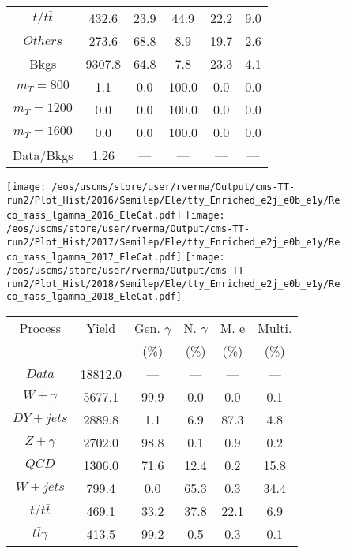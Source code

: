 \begin{figure}
\begin{minipage}[c]{0.32\textwidth}
{\begin{tabular}{cccccc}
$ t/t\bar{t} $ &  432.6 &  23.9 &  44.9 &  22.2 &  9.0\\
$ Others $ &  273.6 &  68.8 &  8.9 &  19.7 &  2.6\\
Bkgs &  9307.8 &  64.8 &  7.8 &  23.3 &  4.1\\
$ m_{T} = 800 $ &  1.1 &  0.0 &  100.0 &  0.0 &  0.0\\
$ m_{T} = 1200 $ &  0.0 &  0.0 &  100.0 &  0.0 &  0.0\\
$ m_{T} = 1600 $ &  0.0 &  0.0 &  100.0 &  0.0 &  0.0\\
Data/Bkgs &  1.26 &  --- &  --- &  --- &  ---\\
\hline
\end{tabular}
}
\end{minipage}
\end{figure}

\begin{figure}
\centering
\texttt{[image: /eos/uscms/store/user/rverma/Output/cms-TT-run2/Plot\_Hist/2016/Semilep/Ele/tty\_Enriched\_e2j\_e0b\_e1y/Reco\_mass\_lgamma\_2016\_EleCat.pdf]}
\texttt{[image: /eos/uscms/store/user/rverma/Output/cms-TT-run2/Plot\_Hist/2017/Semilep/Ele/tty\_Enriched\_e2j\_e0b\_e1y/Reco\_mass\_lgamma\_2017\_EleCat.pdf]}
\texttt{[image: /eos/uscms/store/user/rverma/Output/cms-TT-run2/Plot\_Hist/2018/Semilep/Ele/tty\_Enriched\_e2j\_e0b\_e1y/Reco\_mass\_lgamma\_2018\_EleCat.pdf]}
\begin{minipage}[c]{0.32\textwidth}
\centering
\tiny{
\begin{tabular}{cccccc}
\hline
Process & Yield & Gen. $\gamma$ & N. $\gamma$ & M. e & Multi. \\
 &  & (\%) & (\%) & (\%) & (\%)  \\
\hline
                                                                      $ Data $ &  18812.0 &  --- &  --- &  --- &  ---\\
$ W+\gamma $ &  5677.1 &  99.9 &  0.0 &  0.0 &  0.1\\
$ DY+jets $ &  2889.8 &  1.1 &  6.9 &  87.3 &  4.8\\
$ Z+\gamma $ &  2702.0 &  98.8 &  0.1 &  0.9 &  0.2\\
$ QCD $ &  1306.0 &  71.6 &  12.4 &  0.2 &  15.8\\
$ W+jets $ &  799.4 &  0.0 &  65.3 &  0.3 &  34.4\\
$ t/t\bar{t} $ &  469.1 &  33.2 &  37.8 &  22.1 &  6.9\\
$ t\bar{t}\gamma $ &  413.5 &  99.2 &  0.5 &  0.3 &  0.1\\

\end{tabular}}
\end{minipage}
\end{figure}
